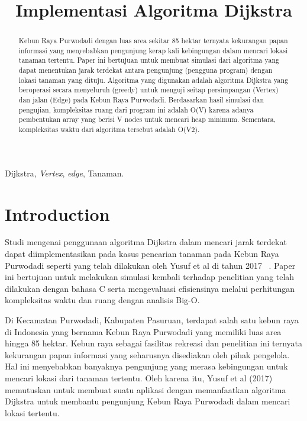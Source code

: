 \documentclass[conference]{IEEEtran}
\title{Implementasi Algoritma Dijkstra}
\author{\IEEEauthorblockN{Muhammad Daffa Daniswara}
\IEEEauthorblockA{\textit{School of Electrical Engineering and Informatics}\\
\textit{Institut Teknologi Bandung}\\
Bandung, Indonesia\\
Email: 13220043@mahasiswa.itb.ac.id}
}
\begin{document}
\maketitle

\begin{abstract}
	Kebun Raya Purwodadi dengan luas area sekitar 85
hektar ternyata kekurangan papan informasi yang menyebabkan
pengunjung kerap kali kebingungan dalam mencari lokasi tanaman
tertentu. Paper ini bertujuan untuk membuat simulasi
dari algoritma yang dapat menentukan jarak terdekat antara
pengunjung (pengguna program) dengan lokasi tanaman yang
dituju. Algoritma yang digunakan adalah algoritma Dijkstra
yang beroperasi secara menyeluruh (greedy) untuk menguji
seitap persimpangan (Vertex) dan jalan (Edge) pada Kebun
Raya Purwodadi. Berdasarkan hasil simulasi dan pengujian,
kompleksitas ruang dari program ini adalah O(V) karena adanya
pembentukan array yang berisi V nodes untuk mencari heap minimum.
Sementara, kompleksitas waktu dari algoritma tersebut
adalah O(V2).
\end{abstract}

\begin{IEEEkeywords}
    Dijkstra, \textit{Vertex}, \textit{edge}, Tanaman.
\end{IEEEkeywords}

\section{Introduction}
    Studi mengenai penggunaan algoritma Dijkstra dalam mencari
jarak terdekat dapat diimplementasikan pada kasus pencarian
tanaman pada Kebun Raya Purwodadi seperti yang telah
dilakukan oleh Yusuf et al di tahun 2017 ~\cite{yusuf2017implementasi}. Paper ini bertujuan
untuk melakukan simulasi kembali terhadap penelitian
yang telah dilakukan dengan bahasa C serta mengevaluasi
efisiensinya melalui perhitungan kompleksitas waktu dan ruang
dengan analisis Big-O.

Di Kecamatan Purwodadi, Kabupaten Pasuruan, terdapat
salah satu kebun raya di Indonesia yang bernama Kebun
Raya Purwodadi yang memiliki luas area hingga 85 hektar.
Kebun raya sebagai fasilitas rekreasi dan penelitian ini ternyata
kekurangan papan informasi yang seharusnya disediakan oleh
pihak pengelola. Hal ini menyebabkan banyaknya pengunjung
yang merasa kebingungan untuk mencari lokasi dari tanaman
tertentu. Oleh karena itu, Yusuf et al (2017) memutuskan
untuk membuat suatu aplikasi dengan memanfaatkan algoritma
Dijkstra untuk membantu pengunjung Kebun Raya Purwodadi
dalam mencari lokasi tertentu.
\end{document}
